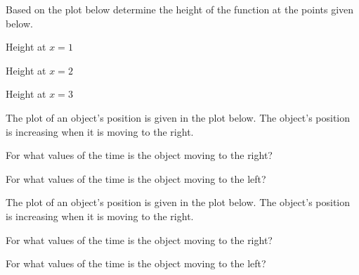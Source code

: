 

\begin{problem}
\item Based on the plot below determine the height of the function at
  the points given below.

  \begin{subproblem}
  \item Height at $x=1$
    \vfill

  \item Height at $x=2$
    \vfill
      
  \item Height at $x=3$
    \vfill

  \end{subproblem}

  \clearpage

\item The plot of an object's position is given in the plot below. The
  object's position is increasing when it is moving to the right.

  \begin{subproblem}
    \item For what values of the time is the object moving to the
      right?
      \vfill
    \item For what values of the time is the object moving to the
      left?
      \vfill
  \end{subproblem}

\item The plot of an object's position is given in the plot below. The
  object's position is increasing when it is moving to the right.

  \begin{subproblem}
    \item For what values of the time is the object moving to the
      right?
      \vfill
    \item For what values of the time is the object moving to the
      left?
      \vfill
  \end{subproblem}

\end{problem}

